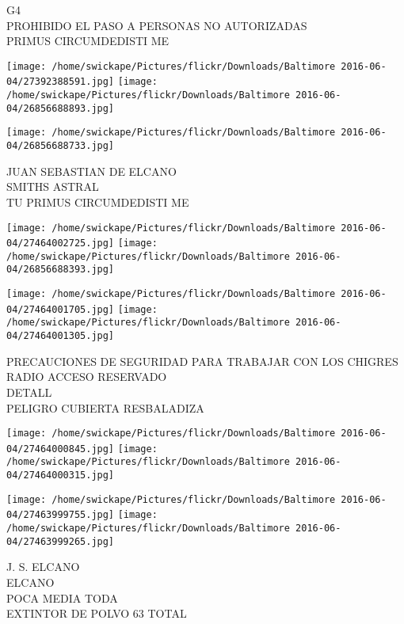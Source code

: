\documentclass[10pt,letterpaper]{article}
\begin{document}
G4\\
PROHIBIDO EL PASO A PERSONAS NO AUTORIZADAS\\
PRIMUS CIRCUMDEDISTI ME\\
\pagebreak

\texttt{[image: /home/swickape/Pictures/flickr/Downloads/Baltimore 2016-06-04/27392388591.jpg]}
\texttt{[image: /home/swickape/Pictures/flickr/Downloads/Baltimore 2016-06-04/26856688893.jpg]}

\vspace{0.25in}
\texttt{[image: /home/swickape/Pictures/flickr/Downloads/Baltimore 2016-06-04/26856688733.jpg]}

JUAN SEBASTIAN DE ELCANO\\
SMITHS ASTRAL\\
TU PRIMUS CIRCUMDEDISTI ME\\
\pagebreak

\texttt{[image: /home/swickape/Pictures/flickr/Downloads/Baltimore 2016-06-04/27464002725.jpg]}
\texttt{[image: /home/swickape/Pictures/flickr/Downloads/Baltimore 2016-06-04/26856688393.jpg]}

\texttt{[image: /home/swickape/Pictures/flickr/Downloads/Baltimore 2016-06-04/27464001705.jpg]}
\texttt{[image: /home/swickape/Pictures/flickr/Downloads/Baltimore 2016-06-04/27464001305.jpg]}

PRECAUCIONES DE SEGURIDAD PARA TRABAJAR CON LOS CHIGRES\\
RADIO ACCESO RESERVADO\\
DETALL\\
PELIGRO CUBIERTA RESBALADIZA\\
\pagebreak

\texttt{[image: /home/swickape/Pictures/flickr/Downloads/Baltimore 2016-06-04/27464000845.jpg]}
\texttt{[image: /home/swickape/Pictures/flickr/Downloads/Baltimore 2016-06-04/27464000315.jpg]}

\texttt{[image: /home/swickape/Pictures/flickr/Downloads/Baltimore 2016-06-04/27463999755.jpg]}
\texttt{[image: /home/swickape/Pictures/flickr/Downloads/Baltimore 2016-06-04/27463999265.jpg]}

J. S. ELCANO\\
ELCANO\\
POCA MEDIA TODA\\
EXTINTOR DE POLVO 63 TOTAL\\
\pagebreak
\end{document}
